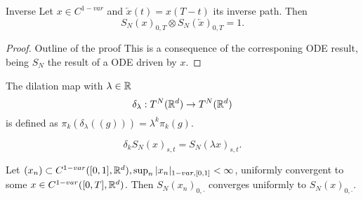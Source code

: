 \begin{proposition}{Inverse}
    Let \(x \in C^{1-var}\) and \(\overleftarrow{x}(t) = x(T-t)\) its inverse path. Then
    \begin{equation}
        S_N(x)_{0,T} \otimes S_N(\overleftarrow{x})_{0,T} = 1.
    \end{equation} 
\end{proposition}
\begin{proof}{Outline of the proof}
    This is a consequence of the corresponing ODE result, being \(S_N\) the result of a ODE driven by \(x\).
\end{proof}

\begin{definition}[Dilation]
    The dilation map with \(\lambda \in \mathbb{R}\)
    \begin{equation}
        \delta_\lambda:T^N(\mathbb{R}^d) \rightarrow T^N(\mathbb{R}^d)
    \end{equation}
    is defined as \(\pi_k(\delta_\lambda((g))) = \lambda^k \pi_k(g).\)
\end{definition}

\begin{example}
    \begin{equation}
        \delta_k S_N(x)_{s,t} = S_N(\lambda x)_{s,t}.
    \end{equation}
\end{example}

\begin{proposition}
    Let \((x_n) \subset C^{1-var}([0,1],\mathbb{R}^d), \sup_n |x_n|_{1-var,[0,1]} < \infty\), uniformly convergent to some \(x \in C^{1-var}([0,T],\mathbb{R}^d)\).
    Then \(S_N(x_n)_{0,\cdot}\) converges uniformly to \(S_N(x)_{0,\cdot}\).
\end{proposition}